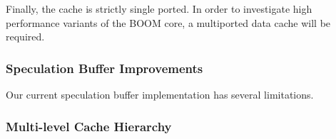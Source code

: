 Finally, the cache is strictly single ported. In order to investigate high performance variants of the BOOM core,
a multiported data cache will be required.

\subsubsection{Speculation Buffer Improvements}
Our current speculation buffer implementation has several limitations.

\subsubsection{Multi-level Cache Hierarchy}
